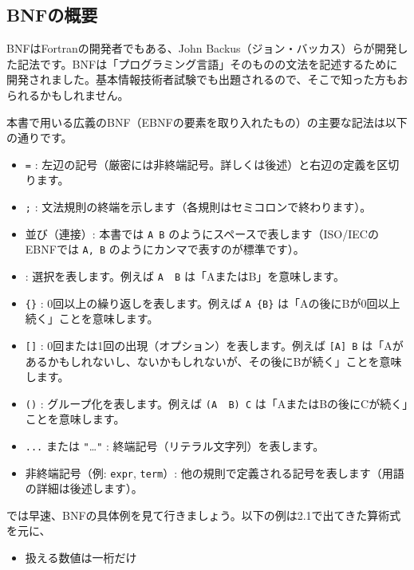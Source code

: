 \hypertarget{chapter2-bnfux306eux6982ux8981}{%
\subsection{BNFの概要}\label{chapter2-bnfux306eux6982ux8981}}

BNFはFortranの開発者でもある、John
Backus（ジョン・バッカス）らが開発した記法です。BNFは「プログラミング言語」そのものの文法を記述するために開発されました。基本情報技術者試験でも出題されるので、そこで知った方もおられるかもしれません。

本書で用いる広義のBNF（EBNFの要素を取り入れたもの）の主要な記法は以下の通りです。

\begin{itemize}
\tightlist
\item
  \texttt{=} :
  左辺の記号（厳密には非終端記号。詳しくは後述）と右辺の定義を区切ります。
\item
  \texttt{;} :
  文法規則の終端を示します（各規則はセミコロンで終わります）。
\item
  並び（連接）: 本書では \texttt{A\ B}
  のようにスペースで表します（ISO/IECのEBNFでは \texttt{A,\ B}
  のようにカンマで表すのが標準です）。
\item
  \texttt{\textbar{}} : 選択を表します。例えば \texttt{A\ \textbar{}\ B}
  は「AまたはB」を意味します。
\item
  \texttt{\{\}} : 0回以上の繰り返しを表します。例えば \texttt{A\ \{B\}}
  は「Aの後にBが0回以上続く」ことを意味します。
\item
  \texttt{{[}{]}} : 0回または1回の出現（オプション）を表します。例えば
  \texttt{{[}A{]}\ B}
  は「Aがあるかもしれないし、ないかもしれないが、その後にBが続く」ことを意味します。
\item
  \texttt{()} : グループ化を表します。例えば
  \texttt{(A\ \textbar{}\ B)\ C}
  は「AまたはBの後にCが続く」ことを意味します。
\item
  \texttt{\textquotesingle{}...\textquotesingle{}} または
  \texttt{"}\ldots{}\texttt{"} : 終端記号（リテラル文字列）を表します。
\item
  非終端記号（例: \texttt{expr}, \texttt{term}）:
  他の規則で定義される記号を表します（用語の詳細は後述します）。
\end{itemize}

では早速、BNFの具体例を見て行きましょう。以下の例は2.1で出てきた算術式を元に、

\begin{itemize}
\tightlist
\item
  扱える数値は一桁だけ
\end{itemize}

